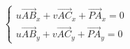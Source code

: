 \documentclass{article}
\begin{document}
\thispagestyle{empty}

$$
\left\{
\begin{array}{lcr}
u\overrightarrow{AB}_x + v\overrightarrow{AC}_x + \overrightarrow{PA}_x = 0\\
u\overrightarrow{AB}_y + v\overrightarrow{AC}_y + \overrightarrow{PA}_y = 0
\end{array}
\right.
$$
\end{document}
